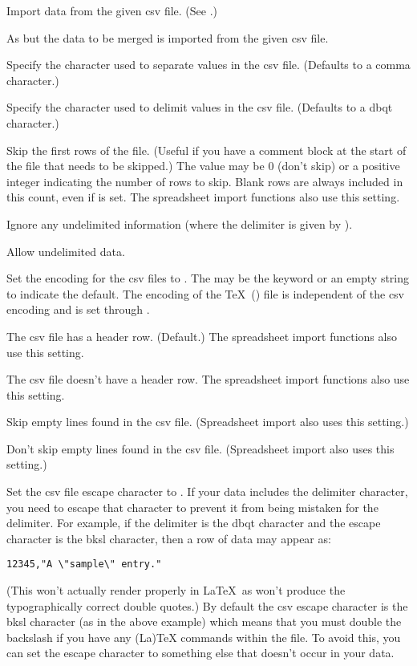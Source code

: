Import data from the given \gls{csv} file.
(See .)

As  but the data to be merged is imported from the given \gls{csv} file.

Specify the character used to separate values in the 
\gls{csv} file. (Defaults to a \gls{comma} character.)

Specify the character used to delimit values in the 
\gls{csv} file. (Defaults to a \gls{dbqt} character.)

Skip the first  rows of the  file. 
(Useful if you have a comment block at the start of the file that
needs to be skipped.)
The value  may be 0 (don't skip) or a positive integer 
indicating the number of rows to skip. Blank rows are always included
in this count, even if  is set.
The spreadsheet import functions also use this setting.

Ignore any undelimited information (where the delimiter is given 
by ).

Allow undelimited data.

Set the encoding for the \gls{csv} files to . The
 may be the keyword  or an empty
string to indicate the default.
The encoding of the \TeX\ () file is independent of the 
\gls{csv} encoding and is set through .

The \gls{csv} file has a header row. (Default.) The spreadsheet import functions
also use this setting.

The \gls{csv} file doesn't have a header row. The spreadsheet import functions
also use this setting.

Skip empty lines found in the \gls{csv} file.
(Spreadsheet import also uses this setting.)

Don't skip empty lines found in the \gls{csv} file.
(Spreadsheet import also uses this setting.)

Set the \gls{csv} file escape character to 
.  If your data includes the delimiter
character, you need to escape that character to prevent it from being
mistaken for the delimiter. For example, if the delimiter is 
the \gls{dbqt} character and the escape character is the \gls{bksl}
character, then a row of data may appear as:
\begin{verbatim}
12345,"A \"sample\" entry."
\end{verbatim} 
(This won't actually render properly in \LaTeX\ as won't produce the
typographically correct double quotes.) By default the \gls{csv}
escape character is the \gls{bksl} character (as in the above
example) which means that you must double the backslash if you have
any (La)TeX commands within the file.  To avoid this, you can set
the escape character to something else that doesn't occur in your
data.

